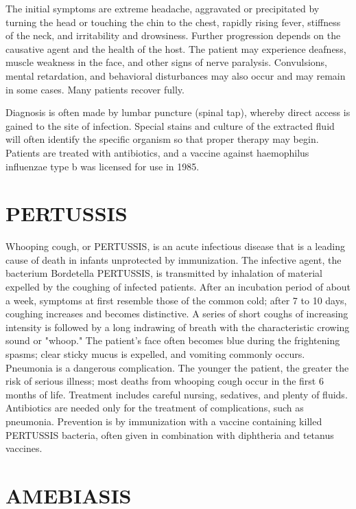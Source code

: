 The initial symptoms are extreme headache, aggravated or 
precipitated by turning the head or touching the chin to the 
chest, rapidly rising fever, stiffness of the neck, and 
irritability and drowsiness.  Further progression depends on 
the causative agent and the health of the host.  The patient 
may experience deafness, muscle weakness in the face, and 
other signs of nerve paralysis.  Convulsions, mental 
retardation, and behavioral disturbances may also occur and 
may remain in some cases.  Many patients recover fully. 

Diagnosis is often made by lumbar puncture (spinal tap), 
whereby direct access is gained to the site of infection. 
Special stains and culture of the extracted fluid will often 
identify the specific organism so that proper therapy may 
begin.  Patients are treated with antibiotics, and a vaccine 
against haemophilus influenzae type b was licensed for use in 
1985. 


\section*{PERTUSSIS}

Whooping cough, or PERTUSSIS, is an acute infectious disease 
that is a leading cause of death in infants unprotected by 
immunization. The infective agent, the bacterium Bordetella 
PERTUSSIS, is transmitted by inhalation of material expelled 
by the coughing of infected patients. After an incubation 
period of about a week, symptoms at first resemble those of 
the common cold; after 7 to 10 days, coughing increases and 
becomes distinctive. A series of short coughs of increasing 
intensity is followed by a long indrawing of breath with the 
characteristic crowing sound or "whoop." The patient's face 
often becomes blue during the frightening spasms; clear sticky 
mucus is expelled, and vomiting commonly occurs. Pneumonia is 
a dangerous complication. The younger the patient, the greater 
the risk of serious illness; most deaths from whooping cough 
occur in the first 6 months of life. Treatment includes 
careful nursing, sedatives, and plenty of fluids. Antibiotics 
are needed only for the treatment of complications, such as 
pneumonia. Prevention is by immunization with a vaccine 
containing killed PERTUSSIS bacteria, often given in 
combination with diphtheria and tetanus
vaccines.

\section*{AMEBIASIS} 

